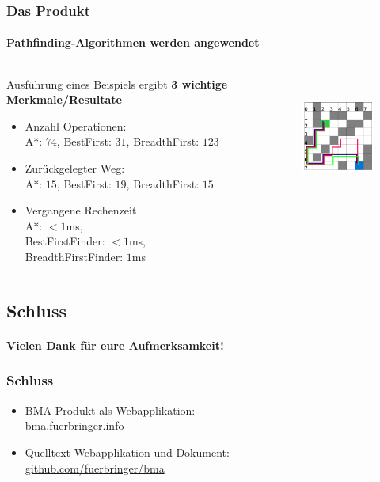 \documentclass[professionalfont,serif,german]{beamer}
\begin{document}
\begin{frame}
  \frametitle{Das Produkt}
  \framesubtitle{Pathfinding-Algorithmen werden angewendet}
  \begin{columns}
    \begin{column}[T]{0.5\textwidth}
      Ausführung eines Beispiels ergibt \textbf{3 wichtige Merkmale/Resultate}
      \begin{itemize}
        \item Anzahl Operationen:
        \\ \textcolor{pfblue}{A*}: $74$, \textcolor{pfred}{BestFirst}: $31$, \textcolor{pfgreen}{BreadthFirst}: $123$
        \item Zurückgelegter Weg:
        \\ \textcolor{pfblue}{A*}: $15$, \textcolor{pfred}{BestFirst}: $19$, \textcolor{pfgreen}{BreadthFirst}: $15$
        \item Vergangene Rechenzeit
        \\ \textcolor{pfblue}{A*}: $< 1$ms, \\ \textcolor{pfred}{BestFirstFinder}: $< 1$ms, \\ \textcolor{pfgreen}{BreadthFirstFinder}: $1$ms
      \end{itemize}
    \end{column}
    \begin{column}[T]{0.5\textwidth}
      \begin{figure}
        \includegraphics[height=4cm]{img/grid3.png}
      \end{figure}
    \end{column}
  \end{columns}
\end{frame}

\begin{frame}
  \section[Vielen Dank für eure Aufmerksamkeit!]{Schluss}
  \framesubtitle{Vielen Dank für eure Aufmerksamkeit!}
  \frametitle{Schluss}
  \begin{itemize}
    \item BMA-Produkt als Webapplikation:\\ \url{bma.fuerbringer.info}
    \item Quelltext Webapplikation und Dokument:\\
      \url{github.com/fuerbringer/bma}
  \end{itemize}
\end{frame}
\end{document}
